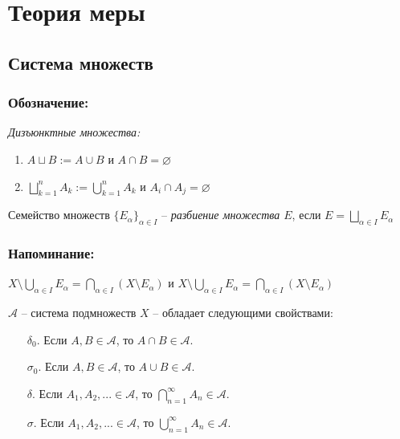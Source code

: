 \setcounter{section}{8}
\section{Теория меры}

\subsection{Система множеств}

\subsubsection*{Обозначение:}

\textit{Дизъюнктные множества:} 
\begin{enumerate}
    \item $A \sqcup B := A \cup B$ и $A \cap B = \varnothing$
    \item $\bigsqcup\limits_{k=1}^n A_k := \bigcup\limits_{k=1}^n A_k$ и $A_i \cap A_j = \varnothing$
\end{enumerate}

\begin{definition}
    Семейство множеств $\{E_\alpha\}_{\alpha\in I}$ – \textit{разбиение множества $E$}, если $E = \bigsqcup\limits_{\alpha\in I} E_\alpha$
\end{definition}

\subsubsection*{Напоминание:}

$X \setminus  \bigcup\limits_{\alpha \in I} E_\alpha = \bigcap\limits_{\alpha \in I} (X\setminus E_\alpha)$ и 
$X \setminus  \bigcup\limits_{\alpha \in I} E_\alpha = \bigcap\limits_{\alpha \in I} (X\setminus E_\alpha)$

\begin{definition}
    $\mathcal{A}$ – система подмножеств $X$ – обладает следующими свойствами:
    \begin{enumerate}
        \item[$\delta_0$.] Если $A, B\in \mathcal{A}$, то $A\cap B\in \mathcal{A}$.
        \item[$\sigma_0$.] Если $A, B\in \mathcal{A}$, то $A\cup B\in \mathcal{A}$.
        \item[$\delta$.] Если $A_1, A_2, ...\in \mathcal{A}$, то $\bigcap\limits_{n = 1}^\infty A_n\in \mathcal{A}$.
        \item[$\sigma$.] Если $A_1, A_2, ...\in \mathcal{A}$, то $\bigcup\limits_{n = 1}^\infty A_n\in \mathcal{A}$.
    \end{enumerate}
\end{definition}

